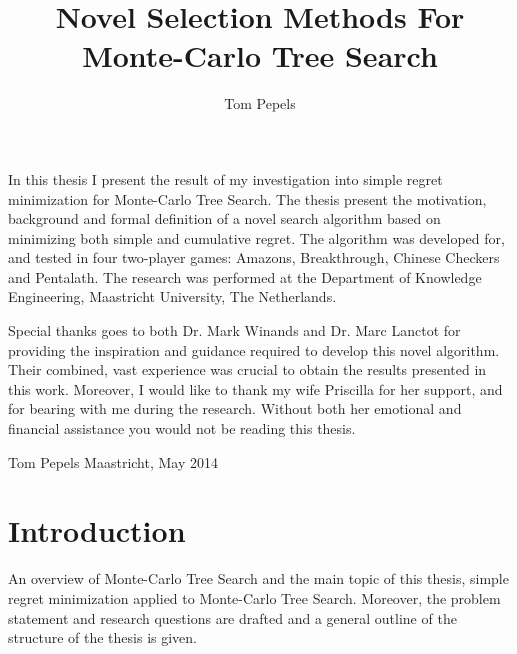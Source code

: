 \documentclass{kecsmstr}
\title{Novel Selection Methods For Monte-Carlo Tree Search}
\author{Tom Pepels}
\begin{document}
\makeheaders {} \maketitle \setcounter{page}{2}
\emptypage

In this thesis I present the result of my investigation into simple regret minimization for Monte-Carlo Tree Search. The thesis present the motivation, background and formal definition of a novel search algorithm based on minimizing both simple and cumulative regret. The algorithm was developed for, and tested in four two-player games: Amazons, Breakthrough, Chinese Checkers and Pentalath. The research was performed at the Department of Knowledge Engineering, Maastricht University, The Netherlands.

Special thanks goes to both Dr. Mark Winands and Dr. Marc Lanctot for providing the inspiration and guidance required to develop this novel algorithm. Their combined, vast experience was crucial to obtain the results presented in this work. Moreover, I would like to thank my wife Priscilla for her support, and for  bearing with me during the research. Without both her emotional and financial assistance you would not be reading this thesis.
\newline \newline

\noindent Tom Pepels \newline
Maastricht, May 2014
\emptypage

 \emptypage

\tableofcontents  \emptypage 
\listofalgorithms \emptypage
{}

\chapter{Introduction}

\begin{chaptercontents} An overview of Monte-Carlo Tree Search and the main topic of this thesis, simple regret minimization applied to Monte-Carlo Tree Search. Moreover, the problem statement and research questions are drafted and a general outline of the structure of the thesis is given.
\end{chaptercontents}
\end{document}
